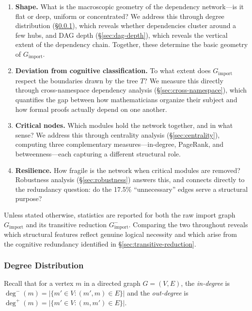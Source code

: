 \begin{enumerate}
\item \textbf{Shape.} What is the macroscopic geometry of the dependency network---is it flat or deep, uniform or concentrated? We address this through degree distribution (\S\ref{sec:degree-distribution}), which reveals whether dependencies cluster around a few hubs, and DAG depth (\S\ref{sec:dag-depth}), which reveals the vertical extent of the dependency chain. Together, these determine the basic geometry of $G_{\mathrm{import}}$.

\item \textbf{Deviation from cognitive classification.} To what extent does $G_{\mathrm{import}}$ respect the boundaries drawn by the tree $T$? We measure this directly through cross-namespace dependency analysis (\S\ref{sec:cross-namespace}), which quantifies the gap between how mathematicians organize their subject and how formal proofs actually depend on one another.

\item \textbf{Critical nodes.} Which modules hold the network together, and in what sense? We address this through centrality analysis (\S\ref{sec:centrality}), computing three complementary measures---in-degree, PageRank, and betweenness---each capturing a different structural role.

\item \textbf{Resilience.} How fragile is the network when critical modules are removed? Robustness analysis (\S\ref{sec:robustness}) answers this, and connects directly to the redundancy question: do the 17.5\% ``unnecessary'' edges serve a structural purpose?
\end{enumerate}

Unless stated otherwise, statistics are reported for both the raw import graph $G_{\mathrm{import}}$ and its transitive reduction $G_{\mathrm{import}}^{-}$. Comparing the two throughout reveals which structural features reflect genuine logical necessity and which arise from the cognitive redundancy identified in \S\ref{sec:transitive-reduction}.

\subsubsection{Degree Distribution}
\label{sec:degree-distribution}

Recall that for a vertex $m$ in a directed graph $G = (V, E)$, the \emph{in-degree} is $\deg^{-}(m) = |\{m' \in V : (m', m) \in E\}|$ and the \emph{out-degree} is $\deg^{+}(m) = |\{m' \in V : (m, m') \in E\}|$.

